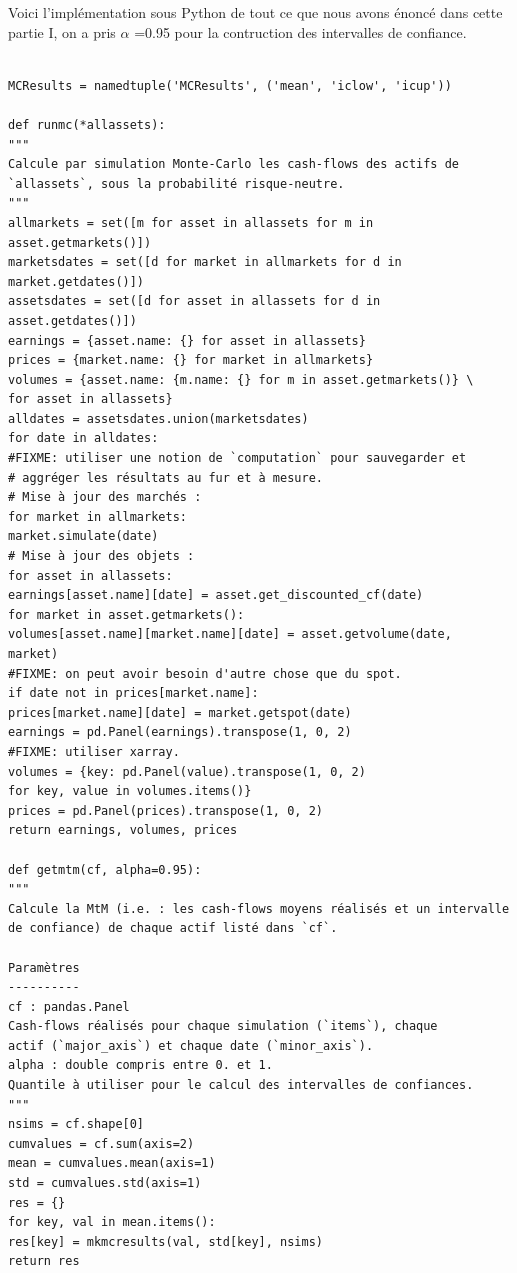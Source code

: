 \documentclass[12pt]{report}
\begin{document}
Voici l’implémentation sous Python de tout ce que nous avons énoncé dans
cette partie I, on a pris  $\alpha$ =0.95 pour la contruction des intervalles de confiance.\\\\
\begin{verbatim}
MCResults = namedtuple('MCResults', ('mean', 'iclow', 'icup'))

def runmc(*allassets):	
"""
Calcule par simulation Monte-Carlo les cash-flows des actifs de
`allassets`, sous la probabilité risque-neutre.
"""
allmarkets = set([m for asset in allassets for m in asset.getmarkets()])
marketsdates = set([d for market in allmarkets for d in market.getdates()])
assetsdates = set([d for asset in allassets for d in asset.getdates()])
earnings = {asset.name: {} for asset in allassets}
prices = {market.name: {} for market in allmarkets}
volumes = {asset.name: {m.name: {} for m in asset.getmarkets()} \
for asset in allassets}
alldates = assetsdates.union(marketsdates)
for date in alldates:
#FIXME: utiliser une notion de `computation` pour sauvegarder et
# aggréger les résultats au fur et à mesure.
# Mise à jour des marchés :
for market in allmarkets:
market.simulate(date)
# Mise à jour des objets :
for asset in allassets:
earnings[asset.name][date] = asset.get_discounted_cf(date)
for market in asset.getmarkets():
volumes[asset.name][market.name][date] = asset.getvolume(date,
market)
#FIXME: on peut avoir besoin d'autre chose que du spot.
if date not in prices[market.name]:
prices[market.name][date] = market.getspot(date)
earnings = pd.Panel(earnings).transpose(1, 0, 2)
#FIXME: utiliser xarray.
volumes = {key: pd.Panel(value).transpose(1, 0, 2)
for key, value in volumes.items()}
prices = pd.Panel(prices).transpose(1, 0, 2)
return earnings, volumes, prices

def getmtm(cf, alpha=0.95):
"""
Calcule la MtM (i.e. : les cash-flows moyens réalisés et un intervalle
de confiance) de chaque actif listé dans `cf`.

Paramètres
----------
cf : pandas.Panel
Cash-flows réalisés pour chaque simulation (`items`), chaque
actif (`major_axis`) et chaque date (`minor_axis`).
alpha : double compris entre 0. et 1.
Quantile à utiliser pour le calcul des intervalles de confiances.
"""
nsims = cf.shape[0]
cumvalues = cf.sum(axis=2)
mean = cumvalues.mean(axis=1)
std = cumvalues.std(axis=1)
res = {}
for key, val in mean.items():
res[key] = mkmcresults(val, std[key], nsims)
return res

\end{verbatim}
\end{document}
